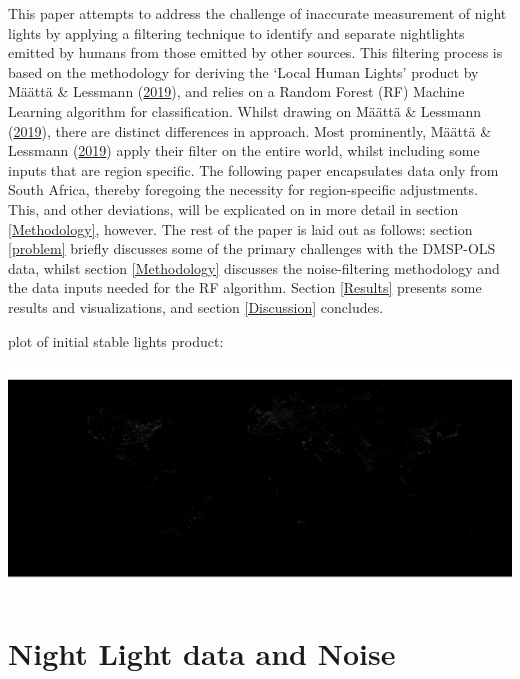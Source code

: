 \documentclass[11pt,preprint, authoryear]{elsarticle}
\let\origfigure\figure
\let\endorigfigure\endfigure
\renewenvironment{figure}[1][2] {
    \expandafter\origfigure\expandafter[H]
} {
    \endorigfigure
}
\numberwithin{equation}{section}
\numberwithin{figure}{section}
\numberwithin{table}{section}
\begin{document}
This paper attempts to address the challenge of inaccurate measurement
of night lights by applying a filtering technique to identify and
separate nightlights emitted by humans from those emitted by other
sources. This filtering process is based on the methodology for deriving
the `Local Human Lights' product by Määttä \& Lessmann
(\protect\hyperlink{ref-maatta}{2019}), and relies on a Random Forest
(RF) Machine Learning algorithm for classification. Whilst drawing on
Määttä \& Lessmann (\protect\hyperlink{ref-maatta}{2019}), there are
distinct differences in approach. Most prominently, Määttä \& Lessmann
(\protect\hyperlink{ref-maatta}{2019}) apply their filter on the entire
world, whilst including some inputs that are region specific. The
following paper encapsulates data only from South Africa, thereby
foregoing the necessity for region-specific adjustments. This, and other
deviations, will be explicated on in more detail in section
\ref{Methodology}, however. The rest of the paper is laid out as
follows: section \ref{problem} briefly discusses some of the primary
challenges with the DMSP-OLS data, whilst section \ref{Methodology}
discusses the noise-filtering methodology and the data inputs needed for
the RF algorithm. Section \ref{Results} presents some results and
visualizations, and section \ref{Discussion} concludes.

plot of initial stable lights product:

\begin{figure}[H]
\includegraphics[width=1\linewidth]{figures/stable_full} \caption{\label{result_plot} The Raw Stable Lights Image}\label{fig:stable}
\end{figure}

\hypertarget{night-light-data-and-noise}{%
\section{\texorpdfstring{Night Light data and Noise
\label{problem}}{Night Light data and Noise }}\label{night-light-data-and-noise}}
\end{document}
